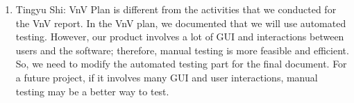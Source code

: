 \documentclass[12pt, titlepage]{article}
\begin{document}
\begin{enumerate}
    \item Tingyu Shi: VnV Plan is different from the activities that  we conducted
    for the VnV report.  In the VnV plan,
    we documented that we will use automated testing. However, our product 
    involves a lot of GUI and interactions between  users and the software; 
    therefore, manual testing is more feasible and efficient. So, we need to 
    modify the automated testing part for the final document. For a future project,
    if it involves many GUI and user interactions, manual testing may be a better
    way to test. 
\end{enumerate}
\end{document}
